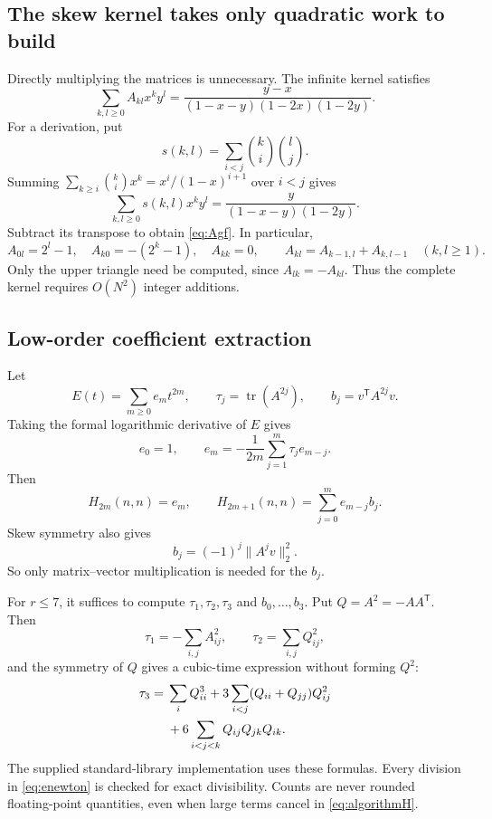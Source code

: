 \documentclass[11pt]{article}
\numberwithin{equation}{section}
\theoremstyle{definition}
\newcommand{\tr}{\operatorname{tr}}
\begin{document}
\subsection{The skew kernel takes only quadratic work to build}
Directly multiplying the matrices is unnecessary. The infinite kernel satisfies
\begin{equation}\label{eq:Agf}
 \sum_{k,l\geq0}A_{kl}x^ky^l
 =\frac{y-x}{(1-x-y)(1-2x)(1-2y)}.
\end{equation}
For a derivation, put
\[
 s(k,l)=\sum_{i<j}\binom ki\binom lj.
\]
Summing $\sum_{k\geq i}\binom ki x^k=x^i/(1-x)^{i+1}$ over $i<j$ gives
\[
 \sum_{k,l\geq0}s(k,l)x^ky^l
 =\frac{y}{(1-x-y)(1-2y)}.
\]
Subtract its transpose to obtain \eqref{eq:Agf}. In particular,
\begin{equation}\label{eq:Arec}
 A_{0l}=2^l-1,\quad A_{k0}=-(2^k-1),\quad A_{kk}=0,
 \qquad A_{kl}=A_{k-1,l}+A_{k,l-1}\quad(k,l\geq1).
\end{equation}
Only the upper triangle need be computed, since $A_{lk}=-A_{kl}$. Thus the complete kernel requires $O(N^2)$ integer additions.

\subsection{Low-order coefficient extraction}
Let
\[
 E(t)=\sum_{m\geq0}e_m t^{2m},\qquad
 \tau_j=\tr(A^{2j}),\qquad b_j=v^{\mathsf T}A^{2j}v.
\]
Taking the formal logarithmic derivative of $E$ gives
\begin{equation}\label{eq:enewton}
 e_0=1,\qquad e_m=-\frac1{2m}\sum_{j=1}^m\tau_j e_{m-j}.
\end{equation}
Then
\begin{equation}\label{eq:algorithmH}
 H_{2m}(n,n)=e_m,\qquad
 H_{2m+1}(n,n)=\sum_{j=0}^m e_{m-j}b_j.
\end{equation}
Skew symmetry also gives
\begin{equation}\label{eq:b-norm}
 b_j=(-1)^j\|A^jv\|_2^2.
\end{equation}
So only matrix--vector multiplication is needed for the $b_j$.

For $r\leq7$, it suffices to compute $\tau_1,\tau_2,\tau_3$ and $b_0,\ldots,b_3$. Put $Q=A^2=-AA^{\mathsf T}$. Then
\[
 \tau_1=-\sum_{i,j}A_{ij}^2,\qquad
 \tau_2=\sum_{i,j}Q_{ij}^2,
\]
and the symmetry of $Q$ gives a cubic-time expression without forming $Q^2$:
\begin{align}\label{eq:tracecube}
 \tau_3={}&\sum_i Q_{ii}^3
 +3\sum_{i<j}(Q_{ii}+Q_{jj})Q_{ij}^2\notag\\
 &+6\sum_{i<j<k}Q_{ij}Q_{jk}Q_{ik}.
\end{align}
The supplied standard-library implementation uses these formulas. Every division in \eqref{eq:enewton} is checked for exact divisibility. Counts are never rounded floating-point quantities, even when large terms cancel in \eqref{eq:algorithmH}.
\end{document}
